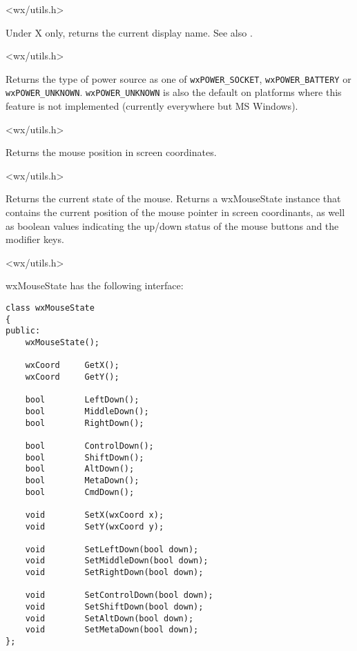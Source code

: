 
<wx/utils.h>


\label{wxgetdisplayname}


Under X only, returns the current display name. See also .


<wx/utils.h>


\label{wxgetpowertype}


Returns the type of power source as one of \texttt{wxPOWER\_SOCKET},
\texttt{wxPOWER\_BATTERY} or \texttt{wxPOWER\_UNKNOWN}.
\texttt{wxPOWER\_UNKNOWN} is also the default on platforms where this
feature is not implemented (currently everywhere but MS Windows).


<wx/utils.h>


\label{wxgetmouseposition}


Returns the mouse position in screen coordinates.


<wx/utils.h>


\label{wxgetmousestate}


Returns the current state of the mouse.  Returns a wxMouseState
instance that contains the current position of the mouse pointer in
screen coordinants, as well as boolean values indicating the up/down
status of the mouse buttons and the modifier keys.


<wx/utils.h>

wxMouseState has the following interface:

\begin{verbatim}
class wxMouseState
{
public:
    wxMouseState();

    wxCoord     GetX();
    wxCoord     GetY();

    bool        LeftDown();
    bool        MiddleDown();
    bool        RightDown();

    bool        ControlDown();
    bool        ShiftDown();
    bool        AltDown();
    bool        MetaDown();
    bool        CmdDown();

    void        SetX(wxCoord x);
    void        SetY(wxCoord y);

    void        SetLeftDown(bool down);
    void        SetMiddleDown(bool down);
    void        SetRightDown(bool down);

    void        SetControlDown(bool down);
    void        SetShiftDown(bool down);
    void        SetAltDown(bool down);
    void        SetMetaDown(bool down);
};
\end{verbatim}




